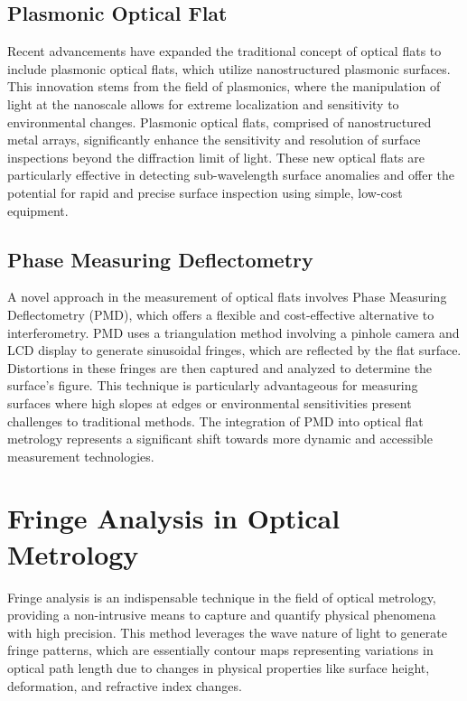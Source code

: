 \documentclass[../main.tex]{subfiles}
\begin{document}
\subsection{Plasmonic Optical Flat}
\vspace{-15pt}
Recent advancements have expanded the traditional concept of optical flats to include plasmonic optical flats, which utilize nanostructured plasmonic surfaces. This innovation stems from the field of plasmonics, where the manipulation of light at the nanoscale allows for extreme localization and sensitivity to environmental changes. Plasmonic optical flats, comprised of nanostructured metal arrays, significantly enhance the sensitivity and resolution of surface inspections beyond the diffraction limit of light. These new optical flats are particularly effective in detecting sub-wavelength surface anomalies and offer the potential for rapid and precise surface inspection using simple, low-cost equipment.\cite{WOS:000387461800007}
\vspace{-15pt}
\subsection{Phase Measuring Deflectometry}
\vspace{-15pt}
A novel approach in the measurement of optical flats involves Phase Measuring Deflectometry (PMD), which offers a flexible and cost-effective alternative to interferometry. PMD uses a triangulation method involving a pinhole camera and LCD display to generate sinusoidal fringes, which are reflected by the flat surface. Distortions in these fringes are then captured and analyzed to determine the surface's figure. This technique is particularly advantageous for measuring surfaces where high slopes at edges or environmental sensitivities present challenges to traditional methods. The integration of PMD into optical flat metrology represents a significant shift towards more dynamic and accessible measurement technologies.\cite{WOS:000385319500019}
\vspace{-15pt}
\section{Fringe Analysis in Optical Metrology}
\vspace{-15pt}
Fringe analysis is an indispensable technique in the field of optical metrology, providing a non-intrusive means to capture and quantify physical phenomena with high precision. This method leverages the wave nature of light to generate fringe patterns, which are essentially contour maps representing variations in optical path length due to changes in physical properties like surface height, deformation, and refractive index changes.
\end{document}
